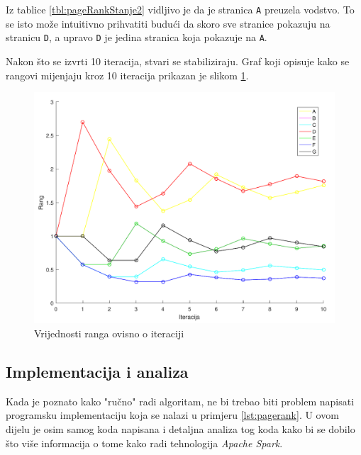 \documentclass[times, utf8, zavrsni, numeric]{fer}
\begin{document}
Iz tablice \ref{tbl:pageRankStanje2} vidljivo je da je stranica \texttt{A} preuzela vodstvo. To se isto može intuitivno prihvatiti budući da skoro sve stranice pokazuju na stranicu \texttt{D}, a upravo \texttt{D} je jedina stranica koja pokazuje na \texttt{A}.

Nakon što se izvrti 10 iteracija, stvari se stabiliziraju. Graf koji opisuje kako se rangovi mijenjaju kroz 10 iteracija prikazan je slikom \ref{fig:grafRangIteracija}.

\begin{figure}[htb]
\centering
\includegraphics[scale = 0.5]{img/grafPageRankStraniceCropped.pdf}
\caption{Vrijednosti ranga ovisno o iteraciji}
\label{fig:grafRangIteracija}
\end{figure}

\subsection{Implementacija i analiza} \label{ssec:implAnalizaPRalg}
Kada je poznato kako "ručno" radi algoritam, ne bi trebao biti problem napisati programsku implementaciju koja se nalazi u primjeru \ref{lst:pagerank}. U ovom dijelu je osim samog koda napisana i detaljna analiza tog koda kako bi se dobilo što više informacija o tome kako radi tehnologija \emph{Apache Spark}. 
\end{document}
